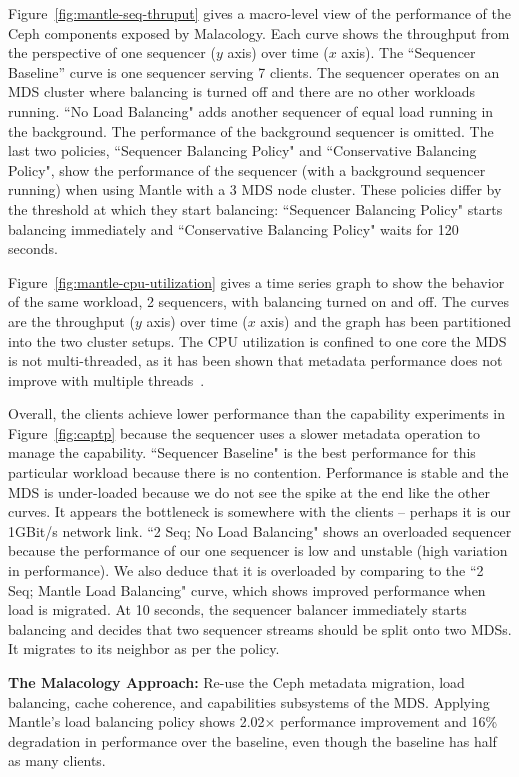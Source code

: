 \documentclass[10pt,twocolumn]{article}
\begin{document}
Figure~\ref{fig:mantle-seq-thruput} gives a macro-level view of the performance
of the Ceph components exposed by Malacology. Each curve shows the throughput
from the perspective of one sequencer (\(y\) axis) over time (\(x\) axis).  The
``Sequencer Baseline'' curve is one sequencer serving 7 clients.  The sequencer
operates on an MDS cluster where balancing is turned off and there are no other
workloads running. ``No Load Balancing" adds another sequencer of equal load
running in the background. The performance of the background sequencer is
omitted. The last two policies, ``Sequencer Balancing Policy" and
``Conservative Balancing Policy", show the performance of the sequencer (with a
background sequencer running) when using Mantle with a 3 MDS node cluster.
These policies differ by the threshold at which they start balancing:
``Sequencer Balancing Policy" starts balancing immediately and ``Conservative
Balancing Policy" waits for 120 seconds.

Figure~\ref{fig:mantle-cpu-utilization} gives a time series graph to show the
behavior of the same workload, 2 sequencers, with balancing turned on and off.
The curves are the throughput (\(y\) axis) over time (\(x\) axis) and the graph
has been partitioned into the two cluster setups. The CPU utilization is
confined to one core the MDS is not multi-threaded, as it has been shown that
metadata performance does not improve with multiple
threads~\cite{konstantinos:pdsw2014-lustre-metadata}. 

Overall, the clients achieve lower performance than the capability experiments
in Figure~\ref{fig:captp} because the sequencer uses a slower metadata
operation to manage the capability.  ``Sequencer Baseline" is the best
performance for this particular workload because there is no contention.
Performance is stable and the MDS is under-loaded because we do not see the
spike at the end like the other curves. It appears the bottleneck is somewhere
with the clients -- perhaps it is our 1GBit/s network link. ``2 Seq; No Load
Balancing" shows an overloaded sequencer because the performance of our one
sequencer is low and unstable (high variation in performance). We also deduce
that it is overloaded by comparing to the ``2 Seq; Mantle Load Balancing"
curve, which shows improved performance when load is migrated. At 10 seconds,
the sequencer balancer immediately starts balancing and decides that two
sequencer streams should be split onto two MDSs. It migrates to its neighbor as
per the policy. 

\textbf{The Malacology Approach:} Re-use the Ceph metadata migration, load
balancing, cache coherence, and capabilities subsystems of the MDS. Applying
Mantle's load balancing policy shows 2.02\(\times\) performance improvement and
16\% degradation in performance over the baseline, even though the baseline has
half as many clients.
\end{document}
